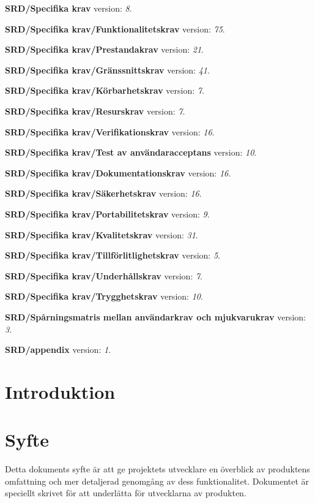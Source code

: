 \documentclass[a4paper, twoside, 11pt, titlepage]{article}
\begin{document}
\textbf{SRD/Specifika krav} version: \emph{8}.

\textbf{SRD/Specifika krav/Funktionalitetskrav} version: \emph{75}.

\textbf{SRD/Specifika krav/Prestandakrav} version: \emph{21}.

\textbf{SRD/Specifika krav/Gränssnittskrav} version: \emph{41}.

\textbf{SRD/Specifika krav/Körbarhetskrav} version: \emph{7}.

\textbf{SRD/Specifika krav/Resurskrav} version: \emph{7}.

\textbf{SRD/Specifika krav/Verifikationskrav} version: \emph{16}.

\textbf{SRD/Specifika krav/Test av användaracceptans} version: \emph{10}.

\textbf{SRD/Specifika krav/Dokumentationskrav} version: \emph{16}.

\textbf{SRD/Specifika krav/Säkerhetskrav} version: \emph{16}.

\textbf{SRD/Specifika krav/Portabilitetskrav} version: \emph{9}.

\textbf{SRD/Specifika krav/Kvalitetskrav} version: \emph{31}.

\textbf{SRD/Specifika krav/Tillförlitlighetskrav} version: \emph{5}.

\textbf{SRD/Specifika krav/Underhållskrav} version: \emph{7}.

\textbf{SRD/Specifika krav/Trygghetskrav} version: \emph{10}.

\textbf{SRD/Spårningsmatris mellan användarkrav och mjukvarukrav} version: \emph{3}.

\textbf{SRD/appendix} version: \emph{1}.

\clearpage \tableofcontents \clearpage

\clearpage
\section{Introduktion}



\clearpage
\section{Syfte}


Detta dokuments syfte är att ge projektets utvecklare en överblick av produktens omfattning och mer detaljerad genomgång av dess funktionalitet. Dokumentet är speciellt skrivet för att underlätta för utvecklarna av produkten. 
\end{document}
